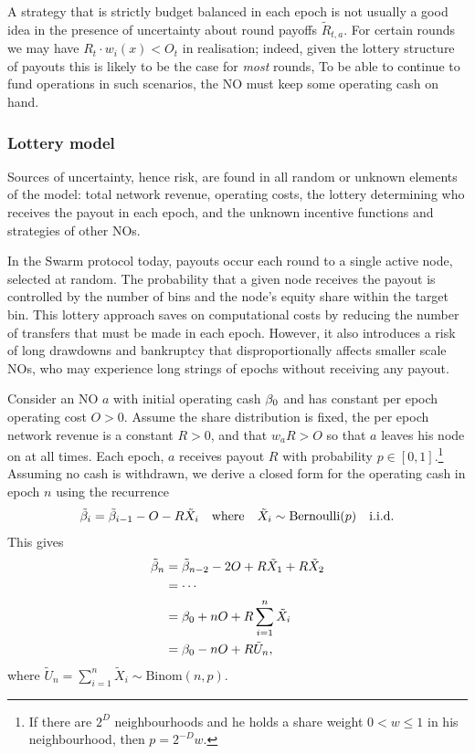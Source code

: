 \begin{example}

  A strategy that is strictly budget balanced in each epoch is not usually a good idea in the presence of uncertainty about round payoffs $\tilde{R}_{t,a}$.
  For certain rounds we may have $R_t\cdot w_i(x) < O_t$ in realisation; indeed, given the lottery structure of payouts this is likely to be the case for \emph{most} rounds,
  To be able to continue to fund operations in such scenarios, the NO must keep some operating cash on hand.

\end{example}

\subsubsection{Lottery model}

Sources of uncertainty, hence risk, are found in all random or unknown elements of the model: total network revenue, operating costs, the lottery determining who receives the payout in each epoch, and the unknown incentive functions and strategies of other NOs.

In the Swarm protocol today, payouts occur each round to a single active node, selected at random.
%
The probability that a given node receives the payout is controlled by the number of bins and the node's equity share within the target bin.
%
This lottery approach saves on computational costs by reducing the number of transfers that must be made in each epoch.
%
However, it also introduces a risk of long drawdowns and bankruptcy that disproportionally affects smaller scale NOs, who may experience long strings of epochs without receiving any payout.

Consider an NO $a$ with initial operating cash $\beta_0$ and has constant per epoch operating cost $O>0$.
%
Assume the share distribution is fixed, the per epoch network revenue is a constant $R>0$, and that $w_aR>O$ so that $a$ leaves his node on at all times.
%
Each epoch, $a$ receives payout $R$ with probability $p\in[0,1]$.\footnote{If there are $2^D$ neighbourhoods and he holds a share weight $0<w\leq 1$ in his neighbourhood, then $p=2^{-D}w$.}
%
Assuming no cash is withdrawn, we derive a closed form for the operating cash in epoch $n$ using the recurrence
%
\[
  \tilde{\beta}_i = \tilde {\beta}_{i-1} - O - R\tilde{X}_i \quad \text{where} \quad \tilde{X}_i \sim \mathrm{Bernoulli}(p) \quad \text{i.i.d.}
\]
%
This gives 
\begin{align*}
  \tilde {\beta}_n &= \tilde {\beta}_{n-2} - 2O + R\tilde X_1 + R\tilde X_2 \\
  & =\cdots \\
  &= \beta_0 + nO + R\sum_{i=1}^n \tilde X_i \\
  &= \beta_0 - nO + R\tilde U_n,
\end{align*}
where $\tilde U_n = \sum_{i=1}^n \tilde X_i \sim \mathrm{Binom}(n,p)$.

